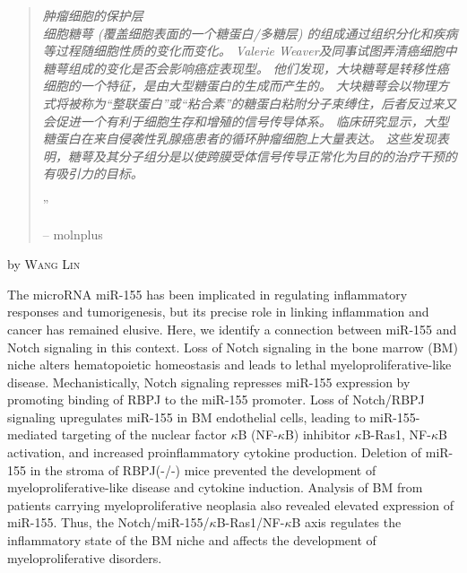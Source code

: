 \documentclass[10pt,a4paper]{article}
\newcommand{\NewsItem}[1]{ %
\usefont{T1}{fvs}{n}{n} %
\vspace{24pt}\large #1\vspace{3pt} %
\par \normalsize \normalfont}
\newcommand{\NewsAuthor}[1]{ %
\hfill by \textsc{#1} \vspace{20pt} %
\par \normalfont}
\begin{document}
\begin{multicols}{2}
\begin{quotation} %

\noindent\normalsize\textit{肿瘤细胞的保护层\\ 细胞糖萼 (覆盖细胞表面的一个糖蛋白/多糖层) 的组成通过组织分化和疾病等过程随细胞性质的变化而变化。
Valerie Weaver及同事试图弄清癌细胞中糖萼组成的变化是否会影响癌症表现型。
他们发现，大块糖萼是转移性癌细胞的一个特征，是由大型糖蛋白的生成而产生的。
大块糖萼会以物理方式将被称为``整联蛋白''或``粘合素''的糖蛋白粘附分子束缚住，后者反过来又会促进一个有利于细胞生存和增殖的信号传导体系。
临床研究显示，大型糖蛋白在来自侵袭性乳腺癌患者的循环肿瘤细胞上大量表达。
这些发现表明，糖萼及其分子组分是以使跨膜受体信号传导正常化为目的的治疗干预的有吸引力的目标。\cite{PasDuFRos1406,EwaEge1406}}

\hfill{\Huge''}

\hfill-- molnplus
\end{quotation}



\NewsItem{{\color{hugoteal}{Notch-Dependent Repression of miR-155 in the Bone Marrow Niche Regulates Hematopoiesis in an NF-$\kappa$B-Dependent Manner}}}
\NewsAuthor{Wang Lin}

The microRNA miR-155 has been implicated in regulating inflammatory responses and tumorigenesis, but its precise role in linking inflammation and cancer has remained elusive.
Here, we identify a connection between miR-155 and Notch signaling in this context.
Loss of Notch signaling in the bone marrow (BM) niche alters hematopoietic homeostasis and leads to lethal myeloproliferative-like disease.
Mechanistically, Notch signaling represses miR-155 expression by promoting binding of RBPJ to the miR-155 promoter.
Loss of Notch/RBPJ signaling upregulates miR-155 in BM endothelial cells, leading to miR-155-mediated targeting of the nuclear factor $\kappa$B (NF-$\kappa$B) inhibitor $\kappa$B-Ras1, NF-$\kappa$B activation, and increased proinflammatory cytokine production.
Deletion of miR-155 in the stroma of RBPJ(-/-) mice prevented the development of myeloproliferative-like disease and cytokine induction.
Analysis of BM from patients carrying myeloproliferative neoplasia also revealed elevated expression of miR-155.
Thus, the Notch/miR-155/$\kappa$B-Ras1/NF-$\kappa$B axis regulates the inflammatory state of the BM niche and affects the development of myeloproliferative disorders.\cite{wang2014notch}

\end{multicols} %
\end{document}
